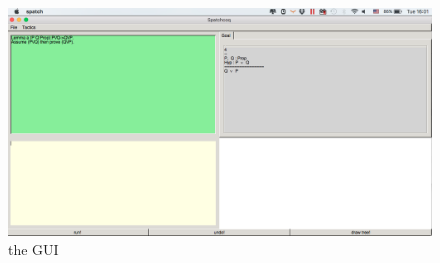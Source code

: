 \begin{figure}[h!]
\includegraphics[scale=0.3]{Installation/main.png}
\caption{the GUI}\label{first look}
\end{figure}
%
%
%
%
%
%

